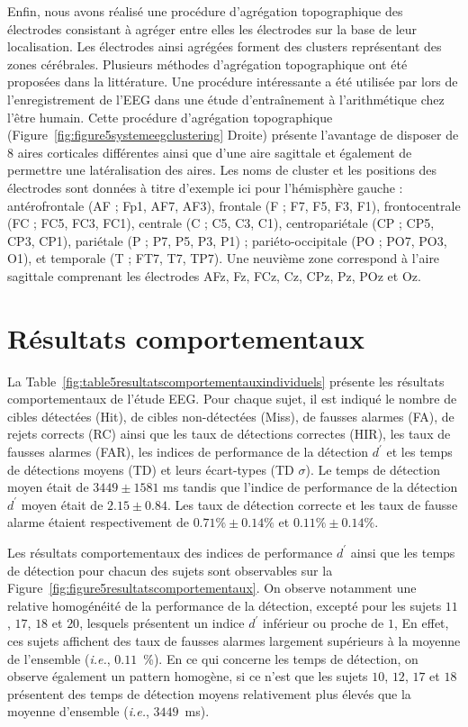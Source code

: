 Enfin, nous avons réalisé une procédure d'agrégation topographique des électrodes consistant à agréger entre elles les électrodes sur la base de leur localisation. 
Les électrodes ainsi agrégées forment des clusters représentant des zones cérébrales. 
Plusieurs méthodes d'agrégation topographique ont été proposées dans la littérature. 
Une procédure intéressante a été utilisée par \cite{grabner2012oscillatory} lors de l'enregistrement de l'EEG dans une étude d'entraînement à l'arithmétique chez l'être humain. 
Cette procédure d'agrégation topographique (Figure~\ref{fig:figure5systemeegclustering} Droite) présente l'avantage de disposer de $8$ aires corticales différentes ainsi que d'une aire sagittale et également de permettre une latéralisation des aires. 
Les noms de cluster et les positions des électrodes sont données à titre d'exemple ici pour l'hémisphère gauche : antérofrontale (AF ; Fp1, AF7, AF3), frontale (F ; F7, F5, F3, F1), frontocentrale (FC ; FC5, FC3, FC1), centrale (C ; C5, C3, C1), centropariétale (CP ; CP5, CP3, CP1), pariétale (P ; P7, P5, P3, P1) ; pariéto-occipitale (PO ; PO7, PO3, O1), et temporale (T ; FT7, T7, TP7). 
Une neuvième zone correspond à l'aire sagittale comprenant les électrodes AFz, Fz, FCz, Cz, CPz, Pz, POz et Oz. 

\section{Résultats comportementaux}
\label{etude2resultatscomportementaux}

La Table~\ref{fig:table5resultatscomportementauxindividuels} présente les résultats comportementaux de l'étude EEG. 
Pour chaque sujet, il est indiqué le nombre de cibles détectées (Hit), de cibles non-détectées (Miss), de fausses alarmes (FA), de rejets corrects (RC) ainsi que les taux de détections correctes (HIR), les taux de fausses alarmes (FAR), les indices de performance de la détection $d^\prime$ et les temps de détections moyens (TD) et leurs écart-types (TD $\sigma$). 
Le temps de détection moyen était de $3449 \pm 1581$ ms tandis que l'indice de performance de la détection $d^\prime$ moyen était de $2.15 \pm 0.84$. 
Les taux de détection correcte et les taux de fausse alarme étaient respectivement de $0.71\% \pm 0.14\%$ et $0.11\% \pm 0.14\%$. 

Les résultats comportementaux des indices de performance $d^\prime$ ainsi que les temps de détection pour chacun des sujets sont observables sur la Figure~\ref{fig:figure5resultatscomportementaux}.
On observe notamment une relative homogénéité de la performance de la détection, excepté pour les sujets $11$, $17$, $18$ et $20$, lesquels présentent un indice $d^\prime$ inférieur ou proche de $1$, 
En effet, ces sujets affichent des taux de fausses alarmes largement supérieurs à la moyenne de l'ensemble (\textit{i.e.}, $0.11$~\%). 
En ce qui concerne les temps de détection, on observe également un pattern homogène, si ce n'est que les sujets $10$, $12$, $17$ et $18$ présentent des temps de détection moyens relativement plus élevés que la moyenne d'ensemble (\textit{i.e.}, $3449$~ms). 

